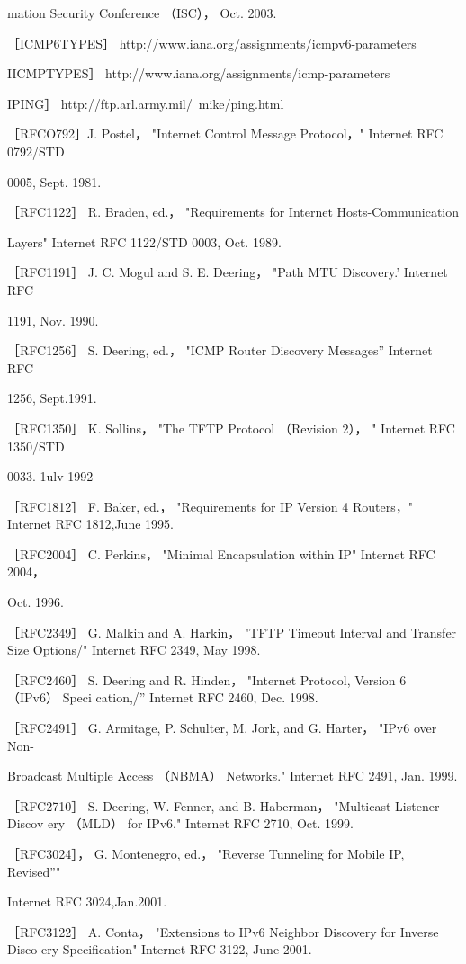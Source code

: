 mation Security Conference （ISC）， Oct. 2003.

［ICMP6TYPES］ http://www.iana.org/assignments/icmpv6-parameters

IICMPTYPES］ http://www.iana.org/assignments/icmp-parameters

IPING］ http://ftp.arl.army.mil/~mike/ping.html

［RFCO792］J. Postel， "Internet Control Message Protocol，" Internet RFC 0792/STD

0005, Sept. 1981.

［RFC1122］ R. Braden, ed.， "Requirements for Internet Hosts-Communication

Layers" Internet RFC 1122/STD 0003, Oct. 1989.

［RFC1191］ J. C. Mogul and S. E. Deering， "Path MTU Discovery.' Internet RFC

1191, Nov. 1990.

［RFC1256］ S. Deering, ed.， "ICMP Router Discovery Messages” Internet RFC

1256, Sept.1991.

［RFC1350］ K. Sollins， "The TFTP Protocol （Revision 2）， " Internet RFC 1350/STD

0033. 1ulv 1992

［RFC1812］ F. Baker, ed.， "Requirements for IP Version 4 Routers，" Internet RFC
1812,June 1995.

［RFC2004］ C. Perkins， "Minimal Encapsulation within IP" Internet RFC 2004，

Oct. 1996.

［RFC2349］ G. Malkin and A. Harkin， "TFTP Timeout Interval and Transfer Size
Options/" Internet RFC 2349, May 1998.

［RFC2460］ S. Deering and R. Hinden， "Internet Protocol, Version 6 （IPv6） Speci
cation,/” Internet RFC 2460, Dec. 1998.

［RFC2491］ G. Armitage, P. Schulter, M. Jork, and G. Harter， "IPv6 over Non-

Broadcast Multiple Access （NBMA） Networks." Internet RFC 2491, Jan. 1999.

［RFC2710］ S. Deering, W. Fenner, and B. Haberman， "Multicast Listener Discov
ery （MLD） for IPv6." Internet RFC 2710, Oct. 1999.

［RFC3024］， G. Montenegro, ed.， "Reverse Tunneling for Mobile IP, Revised”"

Internet RFC 3024,Jan.2001.

［RFC3122］ A. Conta， "Extensions to IPv6 Neighbor Discovery for Inverse Disco
ery Specification" Internet RFC 3122, June 2001.

